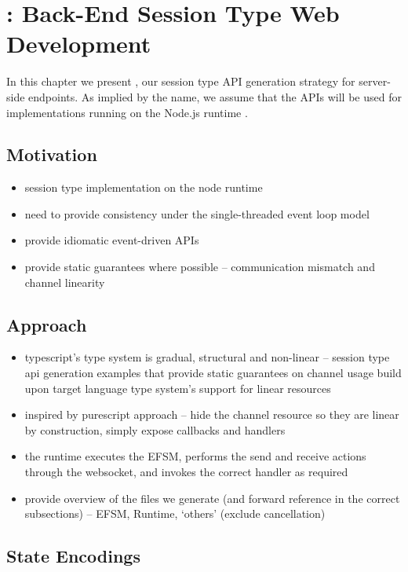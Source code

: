 \chapter{: Back-End Session Type Web Development}
\label{chap:node}

In this chapter we present ,
our session type API generation strategy for 
server-side endpoints. As implied by the name, we assume
that the APIs will be used for implementations running on the
Node.js runtime \cite{Node.js}.

\section{Motivation}
\begin{itemize}
\item session type implementation on the node runtime
\item need to provide consistency under the single-threaded event loop model
\item provide idiomatic event-driven APIs
\item provide static guarantees where possible -- communication mismatch and channel linearity
\end{itemize}

\section{Approach}
\begin{itemize}
\item typescript's type system is gradual, structural and non-linear -- session type api generation examples that provide static guarantees on channel usage build upon target language type system's support for linear resources
\item inspired by purescript approach -- hide the channel resource so they are linear by construction, simply expose callbacks and handlers
\item the runtime executes the EFSM, performs the send and receive actions through the websocket, and invokes the correct handler as required
\item provide overview of the files we generate (and forward reference in the correct subsections) -- EFSM, Runtime, `others' (exclude cancellation)
\end{itemize}

\section{State Encodings}


